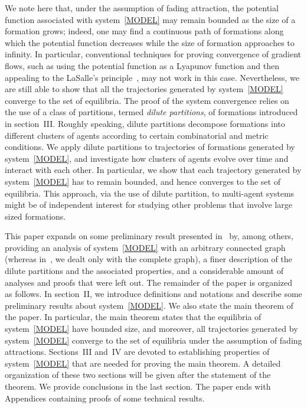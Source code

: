 \documentclass[10pt,twocolumn,twoside]{IEEEtran}
\renewcommand{\(}{\left (}
\renewcommand{\)}{\right )}
\renewcommand{\;}{\,;\,}
\begin{document}
 We note here that,  under the assumption of fading attraction, the potential function associated with system~\eqref{MODEL} may remain bounded as the size of a formation grows; indeed, one may find a continuous path of formations along which the potential function decreases while the size of formation approaches to infinity. In particular,  conventional techniques for proving convergence of gradient flows, such as using the potential function as a Lyapunov function and then appealing to the LaSalle's principle~\cite{lasalle1960some}, may not work in this case. 
Nevertheless, we are still able to show that all the trajectories generated by system~\eqref{MODEL} converge to the set of equilibria. The proof of the system convergence  relies on the use of a class of partitions, termed {\it dilute partitions}, of formations introduced in section~III. Roughly speaking, dilute partitions decompose formations into different clusters of agents according to certain combinatorial and metric conditions. We apply dilute partitions to trajectories of formations generated by system~\eqref{MODEL}, and investigate how clusters of agents evolve over time and interact with each other. In particular, we show that each trajectory generated by system~\eqref{MODEL} has to remain bounded, and hence converges to the set of equilibria.  
This approach, via the use of dilute partition, to multi-agent systems might be of independent interest for studying other problems that involve large sized formations.



This paper expands on some preliminary result presented in~\cite{XC2014ACC} by, among others, providing an analysis of system~\eqref{MODEL} with an arbitrary connected graph (whereas in~\cite{XC2014ACC}, we dealt only with the complete graph), a finer description of the dilute partitions and the associated properties, and a considerable amount of analyses and proofs that were left out. 
The remainder of the paper is organized as follows. In section~II, we introduce definitions and notations and describe some preliminary results about system~\eqref{MODEL}. We also state the main theorem of the paper. In particular, the main theorem states that  the equilibria of system~\eqref{MODEL} have bounded size, and moreover, all trajectories generated by system~\eqref{MODEL} converge to the set of equilibria under the assumption of fading attractions. Sections~III and~IV are devoted to establishing properties of system~\eqref{MODEL} that are needed for proving the main theorem. A detailed organization of these two sections will be given after the statement of the theorem. We provide conclusions in the last section. The paper ends with Appendices containing proofs of some technical results. 
\end{document}
